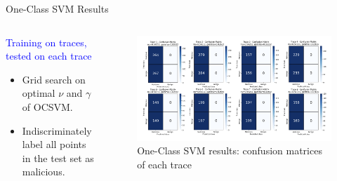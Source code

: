 \documentclass[aspectratio=169, 8pt]{beamer}
\begin{document}
\begin{frame}{One-Class SVM Results}
\begin{columns}

\begin{column}{0.4 \linewidth}
    \textcolor{blue}{\large{Training on traces, tested on each trace}}
    \begin{itemize}
        \item Grid search on optimal \(\nu\) and \(\gamma\) of OCSVM.
        \item Indiscriminately label all points in the test set as malicious.

    \end{itemize}
\end{column}


\begin{column}{0.7 \linewidth}
\begin{figure}
    \centering
    \includegraphics[width = 0.9 \linewidth]{images/ocsvm.png}
    \caption{One-Class SVM results: confusion matrices of each trace}
    \label{fig:enter-label}
\end{figure}


\end{column}

\end{columns}

    
\end{frame}
\end{document}
